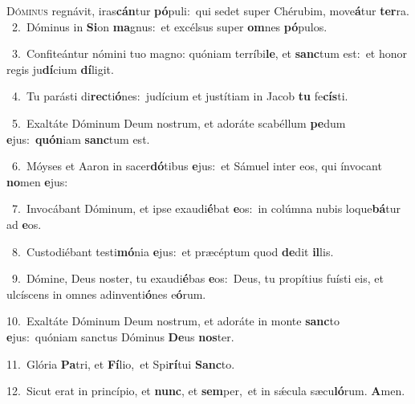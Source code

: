 \lettrine{\initial\textcolor{\initialcolor}{D}}{óminus} regnávit, iras\-\textbf{cán}\-tur \textbf{pó}\-puli:~\star qui sedet super Chérubim, move\-\textbf{á}\-tur \textbf{ter}\-ra.\\
{\numbfont\textcolor{\numbcolor}{~2.}}~Dóminus in \textbf{Si}\-on \textbf{ma}\-gnus:~\star et excélsus super \textbf{om}\-nes \textbf{pó}\-pulos.\par
{\numbfont\textcolor{\numbcolor}{~3.}}~Confiteántur nómini tuo magno: quóniam terríbi\-\textbf{le}\-, et \textbf{sanc}\-tum est:~\star et honor regis ju\-\textbf{dí}\-cium \textbf{dí}\-ligit.\par
{\numbfont\textcolor{\numbcolor}{~4.}}~Tu parásti di\-\textbf{rec}\-ti\-\textbf{ó}\-nes:~\star judícium et justítiam in Jacob \textbf{tu} fe\-\textbf{cís}\-ti.\par
{\numbfont\textcolor{\numbcolor}{~5.}}~Exaltáte Dóminum Deum nostrum, et adoráte scabéllum \textbf{pe}\-dum \textbf{e}\-jus:~\star \textbf{quón}\-iam \textbf{sanc}\-tum est.\par
{\numbfont\textcolor{\numbcolor}{~6.}}~Móyses et Aaron in sacer\-\textbf{dó}\-tibus \textbf{e}\-jus:~\star et Sámuel inter eos, qui ínvocant \textbf{no}\-men \textbf{e}\-jus:\par
{\numbfont\textcolor{\numbcolor}{~7.}}~Invocábant Dóminum, et ipse exaudi\-\textbf{é}\-bat \textbf{e}\-os:~\star in colúmna nubis loque\-\textbf{bá}\-tur ad \textbf{e}\-os.\par
{\numbfont\textcolor{\numbcolor}{~8.}}~Custodiébant testi\-\textbf{mó}\-nia \textbf{e}\-jus:~\star et præcéptum quod \textbf{de}\-dit \textbf{il}\-lis.\par
{\numbfont\textcolor{\numbcolor}{~9.}}~Dómine, Deus noster, tu exaudi\-\textbf{é}\-bas \textbf{e}\-os:~\star Deus, tu propítius fuísti eis, et ulcíscens in omnes adinventi\-\textbf{ó}\-nes e\-\textbf{ó}\-rum.\par
{\numbfont\textcolor{\numbcolor}{10.}}~Exaltáte Dóminum Deum nostrum, et adoráte in monte \textbf{sanc}\-to \textbf{e}\-jus:~\star quóniam sanctus Dóminus \textbf{De}\-us \textbf{nos}\-ter.\par
{\numbfont\textcolor{\numbcolor}{11.}}~Glória \textbf{Pa}\-tri, et \textbf{Fí}\-lio,~\star et Spi\-\textbf{rí}\-tui \textbf{Sanc}\-to.\par
{\numbfont\textcolor{\numbcolor}{12.}}~Sicut erat in princípio, et \textbf{nunc}\-, et \textbf{sem}\-per,~\star et in sǽcula sæcu\-\textbf{ló}\-rum. \textbf{A}\-men.\par
